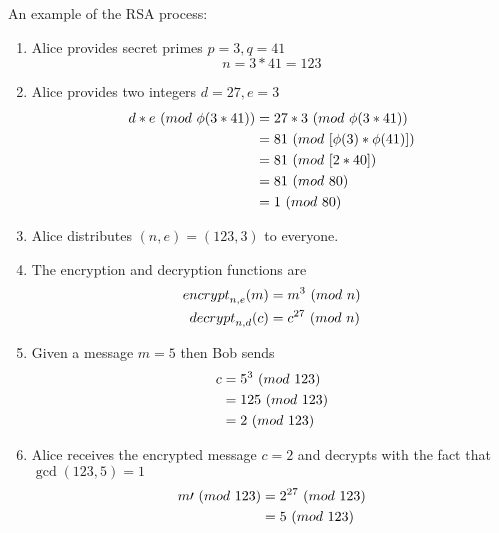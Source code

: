 \begin{remark}
    An example of the RSA process:
    \begin{enumerate}
        \item Alice provides secret primes $p = 3, q = 41$
        \begin{equation}
            n = 3 \ast 41 = 123
        \end{equation}
        \item Alice provides two integers $d = 27, e = 3$
        \begin{align}
            d \ast e \ (\relax{mod}\ \phi(3 \ast 41))  &= 27 \ast 3 \ (\relax{mod}\ \phi(3 \ast 41)) \\
                                            &= 81 \ (\relax{mod}\ [\phi(3) \ast \phi(41)]) \\
                                            &= 81 \ (\relax{mod}\ [2 \ast 40]) \\
                                            &= 81 \ (\relax{mod}\ 80) \\
                                            &= 1 \ (\relax{mod}\ 80)
        \end{align}
        \item Alice distributes $(n, e) = (123, 3)$ to everyone.
        \item The encryption and decryption functions are
        \begin{align}
            \relax{encrypt}_{n, e}(m) &= m^3 \ (\relax{mod}\ n) \\
            \relax{decrypt}_{n, d}(c) &= c^{27} \ (\relax{mod}\ n)
        \end{align}
        \item Given a message $m = 5$ then Bob sends
        \begin{align}
            c &= 5^3 \ (\relax{mod}\ 123) \\
              &= 125 \ (\relax{mod}\ 123) \\
              &= 2 \ (\relax{mod}\ 123)
        \end{align}
        \item Alice receives the encrypted message $c = 2$ and decrypts with the fact that  $\gcd(123, 5) = 1$
        \begin{align}
            m\prime \ (\relax{mod}\ 123) &= 2^{27} \ (\relax{mod}\ 123) \\
                              &= 5 \ (\relax{mod}\ 123)
        \end{align}
    \end{enumerate}
\end{remark}

